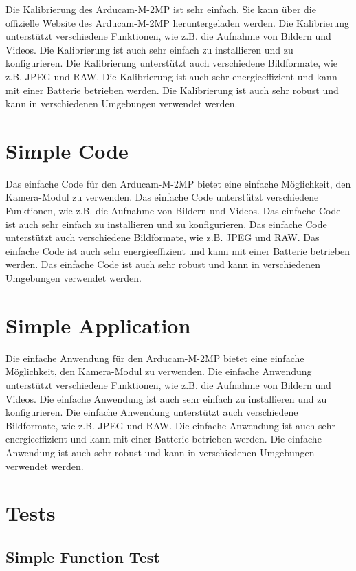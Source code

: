 Die Kalibrierung des Arducam-M-2MP ist sehr einfach. Sie kann über die offizielle Website des Arducam-M-2MP heruntergeladen werden. Die Kalibrierung unterstützt verschiedene Funktionen, wie z.B. die Aufnahme von Bildern und Videos. Die Kalibrierung ist auch sehr einfach zu installieren und zu konfigurieren. Die Kalibrierung unterstützt auch verschiedene Bildformate, wie z.B. JPEG und RAW. Die Kalibrierung ist auch sehr energieeffizient und kann mit einer Batterie betrieben werden. Die Kalibrierung ist auch sehr robust und kann in verschiedenen Umgebungen verwendet werden.

\section{Simple Code}

Das einfache Code für den Arducam-M-2MP bietet eine einfache Möglichkeit, den Kamera-Modul zu verwenden. Das einfache Code unterstützt verschiedene Funktionen, wie z.B. die Aufnahme von Bildern und Videos. Das einfache Code ist auch sehr einfach zu installieren und zu konfigurieren. Das einfache Code unterstützt auch verschiedene Bildformate, wie z.B. JPEG und RAW. Das einfache Code ist auch sehr energieeffizient und kann mit einer Batterie betrieben werden. Das einfache Code ist auch sehr robust und kann in verschiedenen Umgebungen verwendet werden.

\section{Simple Application}

Die einfache Anwendung für den Arducam-M-2MP bietet eine einfache Möglichkeit, den Kamera-Modul zu verwenden. Die einfache Anwendung unterstützt verschiedene Funktionen, wie z.B. die Aufnahme von Bildern und Videos. Die einfache Anwendung ist auch sehr einfach zu installieren und zu konfigurieren. Die einfache Anwendung unterstützt auch verschiedene Bildformate, wie z.B. JPEG und RAW. Die einfache Anwendung ist auch sehr energieeffizient und kann mit einer Batterie betrieben werden. Die einfache Anwendung ist auch sehr robust und kann in verschiedenen Umgebungen verwendet werden.

\section{Tests}

\subsection{Simple Function Test}

